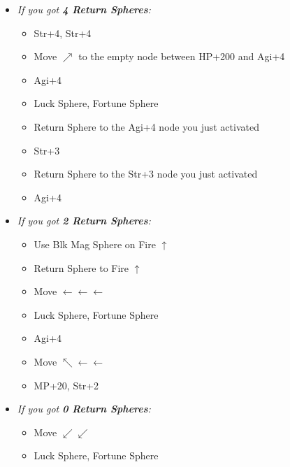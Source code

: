 \begin{spheregrid}
    \begin{itemize}
        \yunaf
        \begin{itemize}
            \item \textit{If you got \textbf{4 Return Spheres}:}
            \begin{itemize}
                \yunaf Friend Sphere to \lulu\ $\downarrow\downarrow$
                \item Str+4, Str+4
                \item Move $\nearrow$ to the empty node between HP+200 and Agi+4
                \item Agi+4
                \item Luck Sphere, Fortune Sphere
                \item Return Sphere to the Agi+4 node you just activated
                \item Str+3
                \item Return Sphere to the Str+3 node you just activated
                \item Agi+4
            \end{itemize}
            \item \textit{If you got \textbf{2 Return Spheres}:}
            \begin{itemize}
                \item Use Blk Mag Sphere on Fire $\uparrow$
                \item Return Sphere to Fire $\uparrow$
                \item Move $\leftarrow\leftarrow\leftarrow$
                \item Luck Sphere, Fortune Sphere
                \item Agi+4
                \item Move $\nwarrow\leftarrow\leftarrow$
                \item MP+20, Str+2
            \end{itemize}
            \item \textit{If you got \textbf{0 Return Spheres}:}
            \begin{itemize}
                \item Move $\swarrow\swarrow$
                \item Luck Sphere, Fortune Sphere
            \end{itemize}
        \end{itemize}
    \end{itemize}
\end{spheregrid}
